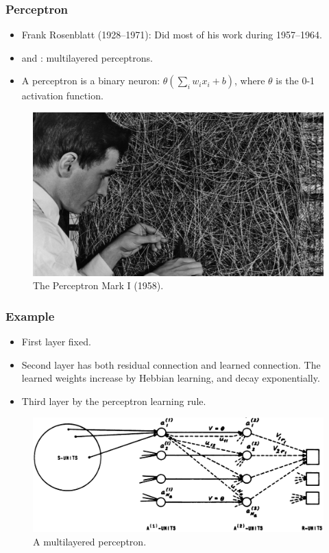 \documentclass{beamer}
\begin{document}
\begin{frame}
\frametitle{Perceptron}
\begin{itemize}
    \item Frank Rosenblatt (1928--1971): Did most of his work during 1957--1964.
    \item \cite{rosenblattPerceptronProbabilisticModel1958} and \cite{rosenblattPrinciplesNeurodynamicsPerceptrons1962}: multilayered perceptrons.
    \item A perceptron is a binary neuron: $\theta(\sum_i w_ix_i + b)$, where $\theta$ is the 0-1 activation function.
\end{itemize}
\begin{figure}[t]
    \includegraphics[width=\textwidth]{figure/Rosenblatt_perceptron_wiring.jpeg}
    \centering
    \caption{The Perceptron Mark I (1958).}
\end{figure} 
\end{frame}

\begin{frame}
    \frametitle{Example}
    \begin{itemize}
        \item First layer fixed.
        \item Second layer has both residual connection and learned connection. The learned weights increase by Hebbian learning, and decay exponentially.
        \item Third layer by the perceptron learning rule.
    \end{itemize}
    \begin{figure}[t]
        \includegraphics[width=\textwidth]{figure/rosenblatt_figure_42.png}
        \centering
        \caption{A multilayered perceptron. \cite[page 347]{rosenblattPrinciplesNeurodynamicsPerceptrons1962}}
    \end{figure}  
\end{frame}
\end{document}
